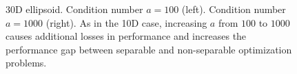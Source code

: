 \begin{figure}[h!]
\begin{minipage}[b]{0.5\linewidth}
 \centering
\end{minipage}
\begin{minipage}[b]{0.5\linewidth}
 \centering
\end{minipage}
\caption{30D ellipsoid. Condition number $a\!=\!100$ (left).  Condition number $a\!=\!1000$ (right). As in the 10D case, increasing $a$ from $100$ to $1000$ causes additional losses in performance and increases the performance gap between separable and non-separable optimization problems.} 

\label{ellipse_t2}
\end{figure}

